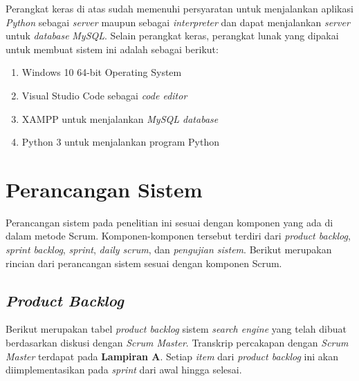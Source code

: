 Perangkat keras di atas sudah memenuhi persyaratan untuk menjalankan aplikasi \textit{Python} sebagai \textit{server} maupun sebagai \textit{interpreter} dan dapat menjalankan \textit{server} untuk \textit{database} \textit{MySQL}. Selain perangkat keras, perangkat lunak yang dipakai untuk membuat sistem ini adalah sebagai berikut:

\begin{enumerate}

\item{Windows 10 64-bit Operating System}
\item{Visual Studio Code sebagai \textit{code editor}}
\item{XAMPP untuk menjalankan \textit{MySQL database}}
\item{Python 3 untuk menjalankan program Python}

\end{enumerate}

\section{Perancangan Sistem}

Perancangan sistem pada penelitian ini sesuai dengan komponen yang ada di dalam metode Scrum. Komponen-komponen tersebut terdiri dari \textit{product backlog}, \textit{sprint backlog}, \textit{sprint}, \textit{daily scrum}, dan \textit{pengujian sistem}. Berikut merupakan rincian dari perancangan sistem sesuai dengan komponen Scrum.

\subsection{\textit{Product Backlog}}

Berikut merupakan tabel \textit{product backlog} sistem \textit{search engine} yang telah dibuat berdasarkan diskusi dengan \textit{Scrum Master}. Transkrip percakapan dengan \textit{Scrum Master} terdapat pada \textbf{Lampiran A}. Setiap \textit{item} dari \textit{product backlog} ini akan diimplementasikan pada \textit{sprint} dari awal hingga selesai.

